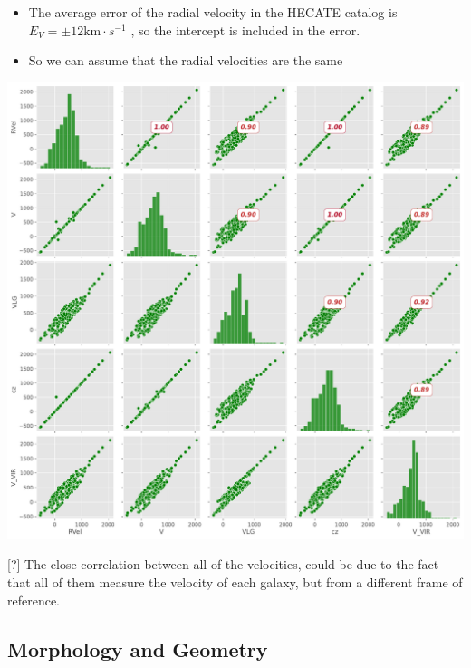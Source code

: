 \documentclass[
]{article}
\providecommand{\tightlist}{%
  \setlength{\itemsep}{0pt}\setlength{\parskip}{0pt}}\usepackage{longtable,booktabs,array}
\begin{document}
\begin{itemize}
\tightlist
\item
  The average error of the radial velocity in the HECATE catalog is
  \(\overline{E_V} = \pm 12\text{km}\cdot s^{-1}\) , so the intercept is
  included in the error.
\item
  So we can assume that the radial velocities are the same
\end{itemize}

\includegraphics{compare_files/figure-pdf/cell-15-output-1.pdf}

{[}?{]} The close correlation between all of the velocities, could be
due to the fact that all of them measure the velocity of each galaxy,
but from a different frame of reference.

\subsection{Morphology and Geometry}\label{morphology-and-geometry}
\end{document}
